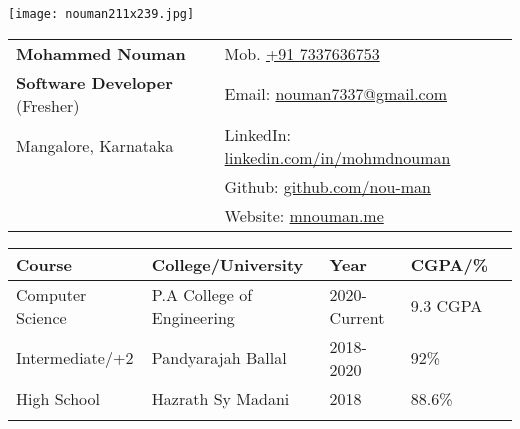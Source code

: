 \documentclass[10pt,article]{article}
\newcommand{\resheading}[1]{{\small \colorbox{mygrey} { \begin{minipage}{0.99\textwidth}\centering{\textbf{#1 \vphantom{p\^{E}}}}\end{minipage}}}}
\begin{document}
\begin{table}
    \begin{minipage}{0\linewidth}
        \centering
        \texttt{[image: nouman211x239.jpg]}
    \end{minipage}
    \begin{minipage}{0.9\linewidth}
        \setlength{\tabcolsep}{70pt}
        \def\arraystretch{1.1}
        \begin{tabular}{ll}
            \textbf{\Large{Mohammed Nouman}}  &  {Mob. \href{tel:+91 7337636753}{+91 7337636753}} \\
            \textbf{Software Developer}{ (Fresher)} &    {Email: \href{mailto:nouman7337@gmail.com}{nouman7337@gmail.com}} \\
            {Mangalore, Karnataka}  & {LinkedIn: \href{https://linkedin.com/in/mohmdnouman}{linkedin.com/in/mohmdnouman}}\\
            {} & {Github: \href{https://github.com/nou-man}{github.com/nou-man}}\\
            {} & {Website: \href{https://mnouman.me}{mnouman.me}}
        \end{tabular}
    \end{minipage}\hfill
\end{table}





\setlength{\tabcolsep}{32pt}
\begin{table}
\centering
\begin{tabular}{lllll}
\toprule
\toprule
\textbf{Course}    & \textbf{College/University}     & \textbf{Year}     & \textbf{CGPA/\%} \\ 
\toprule
Computer Science & P.A College of Engineering  & 2020-Current   & 9.3 CGPA\\ 
Intermediate/+2      & Pandyarajah Ballal & 2018-2020 & 92\%  \\ 
High School      & Hazrath Sy Madani & 2018 & 88.6\%   \\ 
\bottomrule
\bottomrule \\[-0.9cm]
\end{tabular}
\end{table}

\end{document}

